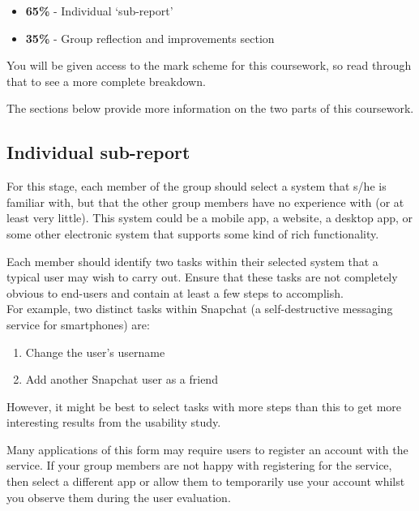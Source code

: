 \documentclass[11pt,a4paper]{report}
\begin{document}
\begin{itemize}
    \item \textbf{65\%} - Individual `sub-report' 
    \item \textbf{35\%} - Group reflection and improvements section 
\end{itemize}
You will be given access to the mark scheme for this coursework, so read through that to see a more complete breakdown.

The sections below provide more information on the two parts of this coursework.

\subsection*{Individual sub-report}
For this stage, each member of the group should select a system that s/he is familiar with, but that the other group members have no experience with (or at least very little). This system could be a mobile app, a website, a desktop app, or some other electronic system that supports some kind of rich functionality.

Each member should identify two tasks within their selected system that a typical user may wish to carry out. Ensure that these tasks are not completely obvious to end-users and contain at least a few steps to accomplish. \\
For example, two distinct tasks within Snapchat (a self-destructive messaging service for smartphones) are:
\begin{enumerate}
    \item Change the user's username
    \item Add another Snapchat user as a friend
\end{enumerate} 
However, it might be best to select tasks with more steps than this to get more interesting results from the usability study.

Many applications of this form may require users to register an account with the service. If your group members are not happy with registering for the service, then select a different app or allow them to temporarily use your account whilst you observe them during the user evaluation. 
\end{document}
